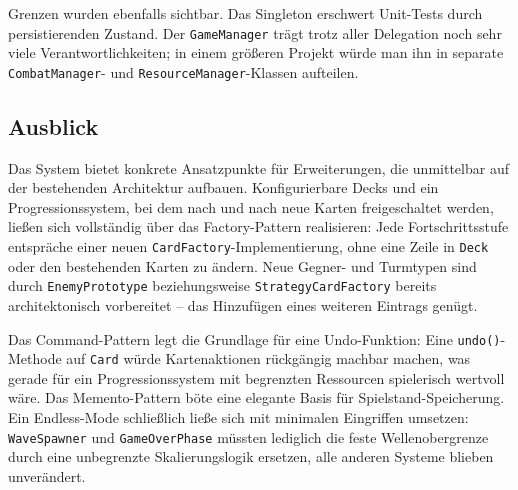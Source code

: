Grenzen wurden ebenfalls sichtbar. Das Singleton erschwert Unit-Tests durch
persistierenden Zustand. Der \texttt{GameManager} trägt trotz aller Delegation
noch sehr viele Verantwortlichkeiten; in einem größeren Projekt würde man ihn in
separate \texttt{CombatManager}- und \texttt{ResourceManager}-Klassen aufteilen.

\subsection{Ausblick}

Das System bietet konkrete Ansatzpunkte für Erweiterungen, die unmittelbar auf
der bestehenden Architektur aufbauen. Konfigurierbare Decks und ein
Progressionssystem, bei dem nach und nach neue Karten freigeschaltet werden,
ließen sich vollständig über das Factory-Pattern realisieren: Jede
Fortschrittsstufe entspräche einer neuen \texttt{CardFactory}-Implementierung,
ohne eine Zeile in \texttt{Deck} oder den bestehenden Karten zu ändern. Neue
Gegner- und Turmtypen sind durch \texttt{EnemyPrototype} beziehungsweise
\texttt{StrategyCardFactory} bereits architektonisch vorbereitet -- das
Hinzufügen eines weiteren Eintrags genügt.

Das Command-Pattern legt die Grundlage für eine Undo-Funktion: Eine
\texttt{undo()}-Methode auf \texttt{Card} würde Kartenaktionen rückgängig
machbar machen, was gerade für ein Progressionssystem mit begrenzten Ressourcen
spielerisch wertvoll wäre. Das Memento-Pattern böte eine elegante Basis für
Spielstand-Speicherung. Ein Endless-Mode schließlich ließe sich mit minimalen
Eingriffen umsetzen: \texttt{WaveSpawner} und \texttt{GameOverPhase} müssten
lediglich die feste Wellenobergrenze durch eine unbegrenzte Skalierungslogik
ersetzen, alle anderen Systeme blieben unverändert.
